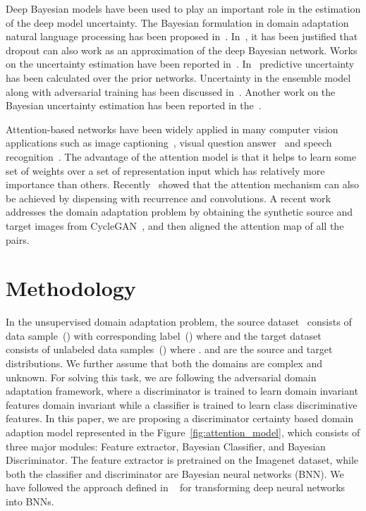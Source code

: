 \documentclass[10pt,twocolumn,letterpaper]{article}
\begin{document}
Deep Bayesian models have been used to play an important role in the estimation of the deep model uncertainty. The Bayesian formulation in domain adaptation natural language processing has been proposed in~\cite{finkel2009hierarchical}. In~\cite{gal_icml2016dropout}, it has been justified that dropout can also work as an approximation of the deep Bayesian network. Works on the uncertainty estimation have been reported in~\cite{Gal2016Uncertainty,kendall2017uncertainties}.  In~\cite{malinin2018predictive} predictive uncertainty has been calculated over the prior networks. Uncertainty in the ensemble model along with adversarial training has been discussed in~\cite{lakshminarayanan_nips2017}. Another work on the Bayesian uncertainty estimation has been reported in the~\cite{teye2018bayesian}.

Attention-based networks have been widely applied in many computer vision applications such as image captioning~\cite{xu2015show,you2016image}, visual question answer~\cite{yang2016stacked,Patro_2018_CVPR,kazemi2017show} and speech recognition~\cite{chorowski2015attention}. The advantage of the attention model is that it helps to learn some set of weights over a set of representation input which has relatively more importance than others. Recently~\cite{vaswani2017attention} showed that the attention mechanism can also be achieved by dispensing with recurrence and convolutions. A recent work~\cite{Kang_2018_ECCV} addresses the domain adaptation problem by obtaining the synthetic source and target images from CycleGAN~\cite{zhu_CVPR2017}, and then aligned the attention map of all the pairs. 
\vspace{-0.2cm}

















\section{Methodology}
In the unsupervised domain adaptation problem, the source dataset~ consists of data sample~() with corresponding label~() where  and the target dataset ~ consists of unlabeled data samples~() where .   and  are the source and target distributions. We further assume that both the domains are complex and unknown.
For solving this task, we are following the adversarial domain adaptation framework, where a discriminator is trained to learn domain invariant features domain invariant while a classifier is trained to learn class discriminative features.  
In this paper, we are proposing a discriminator certainty based domain adaption model represented in the Figure~\ref{fig:attention_model}, which consists of three major modules: Feature extractor, Bayesian Classifier, and Bayesian Discriminator. The feature extractor is pretrained on the Imagenet dataset, while both the classifier and discriminator are Bayesian neural networks (BNN). We have followed the approach defined in ~\cite{gal_icml2016dropout,kendall2017uncertainties,kendall2017multi} for transforming deep neural networks into BNNs.
\end{document}
